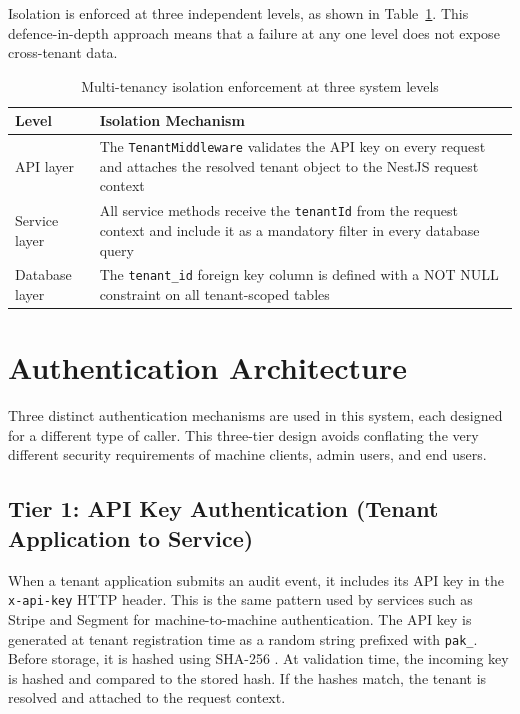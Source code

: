 \documentclass[a4paper,12pt,onecolumn]{report}
\begin{document}
Isolation is enforced at three independent levels, as shown in Table~\ref{tab:tenancy}.
This defence-in-depth approach means that a failure at any one level does not expose cross-tenant data.

\begin{table}[h]
    \begin{center}
        \begin{tabularx}{\textwidth}{|l|X|}
            \hline
            \textbf{Level} & \textbf{Isolation Mechanism} \\
            \hline
            API layer & The \texttt{TenantMiddleware} validates the API key on every request and attaches the resolved tenant object to the NestJS request context \\
            \hline
            Service layer & All service methods receive the \texttt{tenantId} from the request context and include it as a mandatory filter in every database query \\
            \hline
            Database layer & The \texttt{tenant\_id} foreign key column is defined with a NOT NULL constraint on all tenant-scoped tables \\
            \hline
        \end{tabularx}
    \end{center}
    \caption{Multi-tenancy isolation enforcement at three system levels}
    \label{tab:tenancy}
\end{table}

\section{Authentication Architecture}

Three distinct authentication mechanisms are used in this system, each designed for a different type of caller.
This three-tier design avoids conflating the very different security requirements of machine clients, admin users, and end users.

\subsection{Tier 1: API Key Authentication (Tenant Application to Service)}

When a tenant application submits an audit event, it includes its API key in the \texttt{x-api-key} HTTP header.
This is the same pattern used by services such as Stripe and Segment for machine-to-machine authentication.
The API key is generated at tenant registration time as a random string prefixed with \texttt{pak\_}.
Before storage, it is hashed using SHA-256 \cite{sha256}.
At validation time, the incoming key is hashed and compared to the stored hash.
If the hashes match, the tenant is resolved and attached to the request context.
\end{document}

